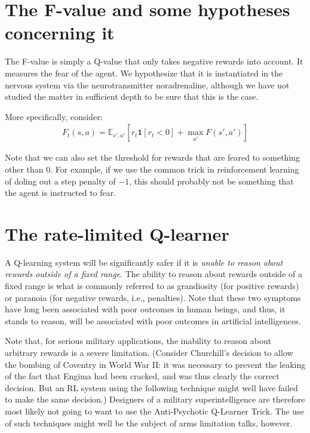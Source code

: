 \documentclass{article}
\begin{document}
\section{The F-value and some hypotheses concerning it}

The F-value is simply a Q-value that only takes negative rewards into
account. It measures the fear of the agent. We hypothesize that it is
instantiated in the nervous system via the neurotransmitter noradrenaline,
although we have not studied the matter in sufficient depth to be sure that
this is the case.

More specifically, consider:
\begin{align}
F_t(s, a) = \mathbb{E}_{s', a'}\left[r_t \mathbf{1}[r_t < 0] + \max_{a'} F(s', a') \right]
\end{align}

Note that we can also set the threshold for rewards that are feared to
something other than 0. For example, if we use the common trick in
reinforcement learning of doling out a step penalty of $-1$, this should
probably not be something that the agent is instructed to fear.

\section{The rate-limited Q-learner}

A Q-learning system will be significantly safer if it is {\em unable to reason
  about rewards outside of a fixed range}. The ability to reason about rewards
outside of a fixed range is what is commonly referred to as grandiosity (for
positive rewards) or paranoia (for negative rewards, i.e., penalties). Note
that these two symptoms have long been associated with poor outcomes in human
beings, and thus, it stands to reason, will be associated with poor outcomes in
artificial intelligences.

Note that, for serious military applications, the inability to reason about
arbitrary rewards is a severe limitation. (Consider Churchill's decision to
allow the bombing of Coventry in World War II: it was necessary to prevent the
leaking of the fact that Engima had been cracked, and was thus clearly the
correct decision. But an RL system using the following technique might well
have failed to make the same decision.) Designers of a military
superintelligence are therefore most likely not going to want to use the
Anti-Psychotic Q-Learner Trick. The use of such techniques might well be the
subject of arms limitation talks, however.
\end{document}
